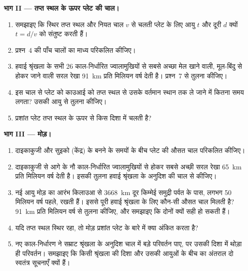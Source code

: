 \begin{problem}[{सप्ताहांत समस्या --- ज्वालामुखियों में लिखी एक प्लेट की चाल}]
\medskip
\noindent\textbf{भाग II --- तप्त स्थल के ऊपर प्लेट की चाल।}
\begin{enumerate}[resume]
  \item समझाइए कि स्थिर तप्त स्थल और नियत
        चाल $v$ से चलती प्लेट के लिए आयु $t$ और दूरी $d$ क्यों $t = d/v$ को संतुष्ट करती हैं।
  \item प्रश्न~4 की पाँच चालों का माध्य परिकलित कीजिए।
  \item हवाई श्रृंखला के सभी 26 काल-निर्धारित ज्वालामुखियों से सबसे अच्छा मेल खाने वाली,
        मूल-बिंदु से होकर जाने वाली सरल रेखा \qty{91}{km} प्रति मिलियन वर्ष देती है।
        प्रश्न~7 से तुलना कीजिए।
  \item इस चाल से प्लेट को काउआई को तप्त स्थल से उसके वर्तमान स्थान तक
        ले जाने में कितना समय लगता? उसकी आयु से तुलना कीजिए।
  \item प्रशांत प्लेट तप्त स्थल के ऊपर से किस दिशा में चलती है?
\end{enumerate}

\medskip
\noindent\textbf{भाग III --- मोड़।}
\begin{enumerate}[resume]
  \item दाइकाकुजी और सुइको (केंद्र) के बनने के समयों के बीच प्लेट की औसत चाल
        परिकलित कीजिए।
  \item दाइकाकुजी से आगे के नौ काल-निर्धारित ज्वालामुखियों से होकर सबसे अच्छी सरल रेखा
        \qty{65}{km} प्रति मिलियन वर्ष देती है। इसकी तुलना
        हवाई श्रृंखला के अनुदिश की चाल से कीजिए।
  \item नई आयु मोड़ का आरंभ किलाउआ से \qty{3668}{km} दूर किम्मेई
        समुद्री पर्वत के पास, लगभग 50 मिलियन वर्ष पहले, रखती हैं।
        इससे पूरी हवाई श्रृंखला के लिए कौन-सी औसत चाल मिलती है?
        \qty{91}{km} प्रति मिलियन वर्ष से तुलना कीजिए, और समझाइए कि दोनों क्यों
        सही हो सकती हैं।
  \item यदि तप्त स्थल स्थिर रहा, तो मोड़ प्रशांत प्लेट के बारे में क्या
        अंकित करता है?
  \item नए काल-निर्धारण ने सम्राट श्रृंखला के अनुदिश चाल में बड़े परिवर्तन पाए,
        पर उसकी दिशा में थोड़ा ही परिवर्तन। समझाइए कि किसी
        श्रृंखला की दिशा और उसकी आयुओं के बीच का अंतराल दो स्वतंत्र
        सूचनाएँ क्यों हैं।
\end{enumerate}


\end{problem}
